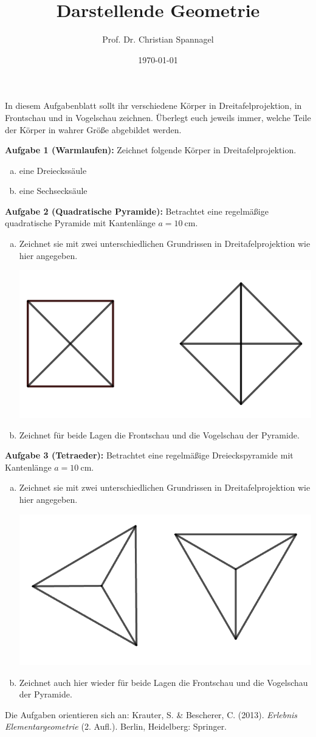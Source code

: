 \documentclass{../cssheet}
\title{Darstellende Geometrie}
\author{Prof. Dr. Christian Spannagel}
\date{\today}
\begin{document}
\printtitle

In diesem Aufgabenblatt sollt ihr verschiedene Körper in Dreitafelprojektion, in Frontschau und in Vogelschau zeichnen. Überlegt euch jeweils immer, welche Teile der Körper in wahrer Größe abgebildet werden.


\textbf{Aufgabe 1 (Warmlaufen):}  Zeichnet folgende Körper in Dreitafelprojektion. 
\begin{enumerate}[a)]
\item eine Dreieckssäule
\item eine Sechsecksäule
\end{enumerate}

\textbf{Aufgabe 2 (Quadratische Pyramide):}  Betrachtet eine regelmäßige quadratische Pyramide mit Kantenlänge $a=\SI{10}{\cm}$.
\begin{enumerate}[a)]
\item Zeichnet sie mit zwei unterschiedlichen Grundrissen in Dreitafelprojektion wie hier angegeben.
\begin{center}
\includegraphics[width=6 cm]{quad-pyramide.png}
\end{center}
\item Zeichnet für beide Lagen die Frontschau und die Vogelschau der Pyramide. 
\end{enumerate}

\textbf{Aufgabe 3 (Tetraeder):}  Betrachtet eine regelmäßige Dreieckspyramide mit Kantenlänge $a=\SI{10}{\cm}$.
\begin{enumerate}[a)]
\item Zeichnet sie mit zwei unterschiedlichen Grundrissen in Dreitafelprojektion wie hier angegeben.
\begin{center}
\includegraphics[width=6 cm]{tetraeder.png}
\end{center}
\item Zeichnet auch hier wieder für beide Lagen die Frontschau und die Vogelschau der Pyramide. 

\end{enumerate}

Die Aufgaben orientieren sich an: Krauter, S. \& Bescherer, C. (2013). \emph{Erlebnis Elementargeometrie} (2. Aufl.). Berlin, Heidelberg: Springer.

\printlicense

\printsocials
\end{document}
